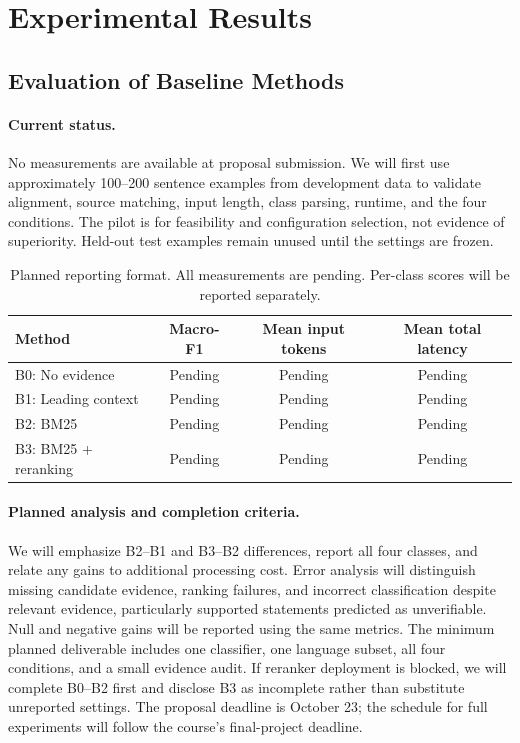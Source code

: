 \section{Experimental Results}
\label{section:exp}
\subsection{Evaluation of Baseline Methods}
\paragraph{Current status.}
No measurements are available at proposal submission. We will first use approximately 100--200 sentence examples from development data to validate alignment, source matching, input length, class parsing, runtime, and the four conditions. The pilot is for feasibility and configuration selection, not evidence of superiority. Held-out test examples remain unused until the settings are frozen.

\begin{table}[htbp]
\centering
\small
\caption{Planned reporting format. All measurements are pending. Per-class scores will be reported separately.}
\begin{tabularx}{\linewidth}{@{}Xccc@{}}
\toprule
Method & Macro-F1 & Mean input tokens & Mean total latency \\
\midrule
B0: No evidence & Pending & Pending & Pending \\
B1: Leading context & Pending & Pending & Pending \\
B2: BM25 & Pending & Pending & Pending \\
B3: BM25 + reranking & Pending & Pending & Pending \\
\bottomrule
\end{tabularx}
\end{table}

\paragraph{Planned analysis and completion criteria.}
We will emphasize B2--B1 and B3--B2 differences, report all four classes, and relate any gains to additional processing cost. Error analysis will distinguish missing candidate evidence, ranking failures, and incorrect classification despite relevant evidence, particularly supported statements predicted as unverifiable. Null and negative gains will be reported using the same metrics. The minimum planned deliverable includes one classifier, one language subset, all four conditions, and a small evidence audit. If reranker deployment is blocked, we will complete B0--B2 first and disclose B3 as incomplete rather than substitute unreported settings. The proposal deadline is October 23; the schedule for full experiments will follow the course's final-project deadline.
